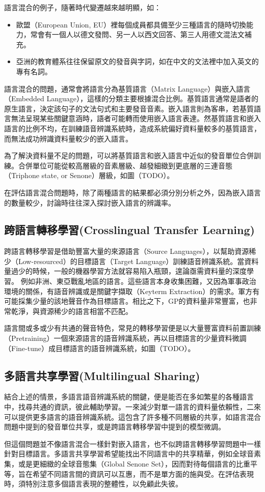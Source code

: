 語言混合的例子，隨著時代變遷越來越明顯，如：
\begin{itemize}
\itemsep -2pt
\item 歐盟（European Union, EU）裡每個成員都具備至少三種語言的隨時切換能力，常會有一個人以德文發問、另一人以西文回答、第三人用德文混法文補充。
\item 亞洲的教育體系往往保留原文的發音與字詞，如在中文的文法裡中加入英文的專有名詞。
\end{itemize}
語言混合的問題，通常會將語言分為基質語言（Matrix Language）與嵌入語言（Embedded Language），這樣的分類主要根據混合比例。基質語言通常是語者的原生語言，決定該句子的文法句式和主要發音音素。嵌入語言則為客串，若基質語言無法呈現某些關鍵意涵時，語者可能轉而使用嵌入語言表達。然基質語言和嵌入語言的比例不均，在訓練語音辨識系統時，造成系統偏好資料量較多的基質語言，而無法成功辨識資料量較少的嵌入語言。

為了解決資料量不足的問題，可以將基質語言和嵌入語言中近似的發音單位合併訓練。合併單位可能從較高層級的音素層級、越發細緻到更底層的三連音態（Triphone state, or Senone）層級，如圖（TODO）。


在評估語言混合問題時，除了兩種語言的結果都必須分別分析之外，因為嵌入語言的數量較少，討論時往往深入探討嵌入語言的辨識率。


\subsection{跨語言轉移學習(Crosslingual Transfer Learning)}
跨語言轉移學習是借助豐富大量的來源語言（Source Languages），以幫助資源稀少（Low-resourced）的目標語言（Target Language）訓練語音辨識系統。當資料量過少的時候，一般的機器學習方法就容易陷入瓶頸，遑論亟需資料量的深度學習。
例如非洲、東亞戰亂地區的語言。這些語言本身收集困難，又因為軍事政治環境的關係，有語音辨識或是關鍵字擷取（Keyterm Extraction）的需求。軍方有可能採集少量的該地聲音作為目標語言。相比之下，GP的資料量非常豐富，也非常乾淨，與資源稀少的語言相當不匹配。

語言間或多或少有共通的聲音特色，常見的轉移學習便是以大量豐富資料前置訓練（Pretraining）一個來源語言的語音辨識系統，再以目標語言的少量資料微調（Fine-tune）成目標語言的語音辨識系統，如圖（TODO）。
\subsection{多語言共享學習(Multilingual Sharing)}
結合上述的情景，多語言語音辨識系統的關鍵，便是能否在多如繁星的各種語言中，找尋共通的資訊，彼此輔助學習。一來減少對單一語言的資料量依賴性，二來可以提供更多語言的語音辨識系統。這包含了許多種不同層級的共享，如語言混合問題中提到的發音單位共享，或是跨語言轉移學習中提到的模型微調。

但這個問題並不像語言混合一樣針對嵌入語言，也不似跨語言轉移學習問題中一樣針對目標語言。多語言共享學習希望能找出不同語言中的共享精華，例如全球音素集，或是更細緻的全球音態集（Global Senone Set），因而對待每個語言的比重平等，旨在希望不同語言間的資訊可以互惠，而不是單方面的施與受。在評估表現時，須特別注意多個語言表現的整體性，以免顧此失彼。
